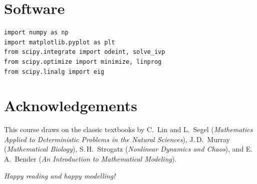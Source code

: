 \section*{Software}

\begin{codeblock}[title=\textbf{Python Libraries Used}]
\begin{verbatim}
import numpy as np
import matplotlib.pyplot as plt
from scipy.integrate import odeint, solve_ivp
from scipy.optimize import minimize, linprog
from scipy.linalg import eig
\end{verbatim}
\end{codeblock}

\section*{Acknowledgements}

This course draws on the classic textbooks by C.~Lin and L.~Segel
(\textit{Mathematics Applied to Deterministic Problems in the Natural
Sciences}), J.\,D.~Murray (\textit{Mathematical Biology}),
S.\,H.~Strogatz (\textit{Nonlinear Dynamics and Chaos}), and
E.\,A.~Bender (\textit{An Introduction to Mathematical Modeling}).

\bigskip
\begin{flushright}
\textit{Happy reading and happy modelling!}
\end{flushright}
